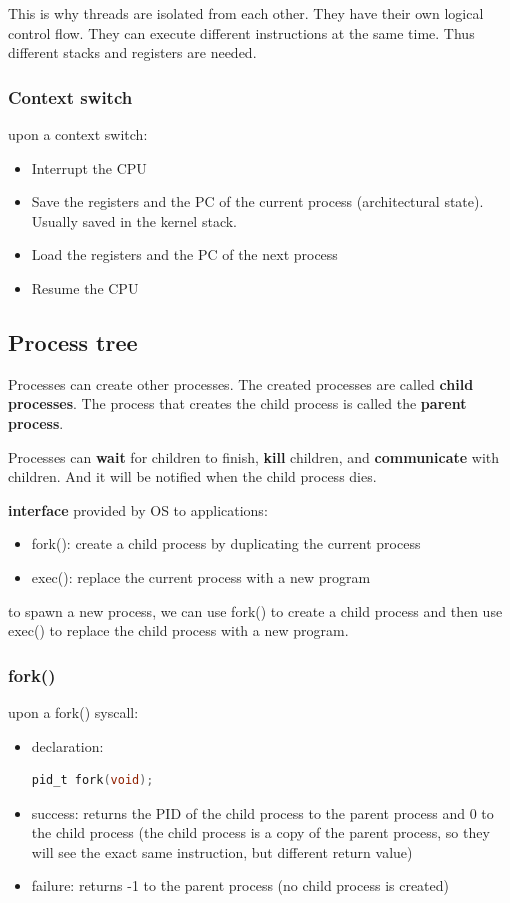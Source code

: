 \documentclass[letterpaper,12pt]{article}
\begin{document}
This is why threads are isolated from each other. They have their own logical
control flow. They can execute different instructions at the same time. Thus
different stacks and registers are needed.
\subsubsection{Context switch}
upon a context switch:\begin{itemize}
    \item Interrupt the CPU
    \item Save the registers and the PC of the current process (architectural state).
          Usually saved in the kernel stack.
    \item Load the registers and the PC of the next process
    \item Resume the CPU
\end{itemize}
\subsection{Process tree}
Processes can create other processes. The created processes are called
\textbf{child processes}. The process that creates the child process is called
the \textbf{parent process}.

Processes can \textbf{wait} for children to finish, \textbf{kill} children, and
\textbf{communicate} with children. And it will be notified when the child
process dies.

\textbf{interface} provided by OS to applications: \begin{itemize}
    \item fork(): create a child process by duplicating the current process
    \item exec(): replace the current process with a new program
\end{itemize}
to spawn a new process, we can use fork() to create a child process and then use exec() to replace the child process with a new program.

\subsubsection{fork()}
upon a fork() syscall:\begin{itemize}
    \item declaration: \begin{lstlisting}[language=C]
        pid_t fork(void);
    \end{lstlisting}
    \item success: returns the PID of the child process to the parent process and 0 to
          the child process (the child process is a copy of the parent process, so they
          will see the exact same instruction, but different return value)
    \item failure: returns -1 to the parent process (no child process is created)
\end{itemize}
\end{document}

